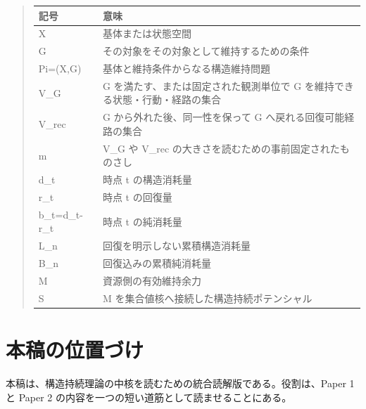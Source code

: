 \documentclass[12pt,a4paper]{article}
\begin{document}
\begin{abstract}
{\def\LTcaptype{table} %
\begin{longtable}[]{@{}
  >{\raggedright\arraybackslash}p{}
  >{\raggedright\arraybackslash}p{}@{}}
\toprule\noalign{}
\begin{minipage}[b]{\linewidth}\raggedright
記号
\end{minipage} & \begin{minipage}[b]{\linewidth}\raggedright
意味
\end{minipage} \\
\midrule\noalign{}
\endhead
\bottomrule\noalign{}
\endlastfoot
X & 基体または状態空間 \\
G & その対象をその対象として維持するための条件 \\
Pi=(X,G) & 基体と維持条件からなる構造維持問題 \\
V\_G & G を満たす、または固定された観測単位で G を維持できる状態・行動・経路の集合 \\
V\_rec & G から外れた後、同一性を保って G へ戻れる回復可能経路の集合 \\
m & V\_G や V\_rec の大きさを読むための事前固定されたものさし \\
d\_t & 時点 t の構造消耗量 \\
r\_t & 時点 t の回復量 \\
b\_t=d\_t-r\_t & 時点 t の純消耗量 \\
L\_n & 回復を明示しない累積構造消耗量 \\
B\_n & 回復込みの累積純消耗量 \\
M & 資源側の有効維持余力 \\
S & M を集合値核へ接続した構造持続ポテンシャル \\
\end{longtable}
}
\end{abstract}

\section{本稿の位置づけ}\label{ux672cux7a3fux306eux4f4dux7f6eux3065ux3051}

本稿は、構造持続理論の中核を読むための統合読解版である。役割は、Paper 1 と Paper 2 の内容を一つの短い道筋として読ませることにある。
\end{document}
